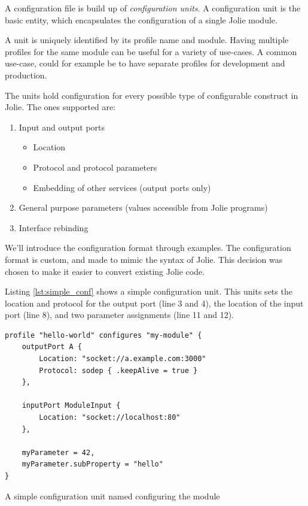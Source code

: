 
A configuration file is build up of \emph{configuration units}.  A
configuration unit is the basic entity, which encapsulates the configuration of
a single Jolie module.

A unit is uniquely identified by its profile name and module. Having multiple
profiles for the same module can be useful for a variety of use-cases. A common
use-case, could for example be to have separate profiles for development and
production.

The units hold configuration for every possible type of configurable construct
in Jolie. The ones supported are:

\begin{enumerate}
    \item Input and output ports
        \begin{itemize}
            \item Location
            \item Protocol and protocol parameters
            \item Embedding of other services (output ports only)
        \end{itemize}
    \item General purpose parameters (values accessible from
            Jolie programs)
    \item Interface rebinding
\end{enumerate}

We'll introduce the configuration format through examples. The configuration
format is custom, and made to mimic the syntax of Jolie. This decision was
chosen to make it easier to convert existing Jolie code.

Listing \ref{lst:simple_conf} shows a simple configuration unit. This
units sets the location and protocol for the output port  (line 3 and
        4), the location of the input port  (line 8), and
two parameter assignments (line 11 and 12).

\begin{listing}[H]
\begin{verbatim}
profile "hello-world" configures "my-module" {
    outputPort A {
        Location: "socket://a.example.com:3000"
        Protocol: sodep { .keepAlive = true }
    },

    inputPort ModuleInput {
        Location: "socket://localhost:80"
    },

    myParameter = 42,
    myParameter.subProperty = "hello"
}
\end{verbatim}

\caption{A simple configuration unit named 
    configuring the module }

\label{lst:simple_conf}

\end{listing}

